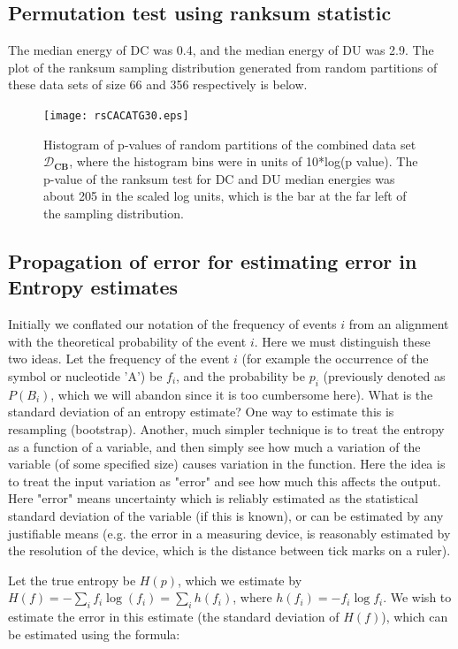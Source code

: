 \subsection{Permutation test using ranksum statistic } 

The median energy of DC was 0.4, and the median energy of DU was 2.9.  The plot of the ranksum sampling distribution generated from random partitions of these data sets of size 66 and 356 respectively is below.
\begin{figure}[!htbp]
 \texttt{[image: rsCACATG30.eps]}\\
  \caption{ Histogram of p-values of random partitions of the combined data set $\mathcal D_{\textbf{CB}}$, where the histogram bins were in units of 10*log(p value).  The p-value of the ranksum test for DC and DU median energies was about 205 in the scaled log units, which is the bar at the far left of the sampling distribution. }
\end{figure}\label{bb}
\newpage
\subsection*{Propagation of error for estimating error in Entropy estimates }
Initially we conflated our notation of the frequency of events $i$ from an alignment with the theoretical probability of the event $i$.  Here we must distinguish these two ideas.  Let the frequency of the event $i$ (for example the occurrence of the symbol or nucleotide 'A') be $f_i$, and the probability be $p_i$ (previously denoted as $P(B_i)$, which we will abandon since it is too cumbersome here).  What is the standard deviation of an entropy estimate?  One way to estimate this is resampling (bootstrap).  Another, much simpler technique is to treat the entropy as a function of a variable, and then simply see how much a variation of the variable (of some specified size) causes variation in the function.  Here the idea is to treat the input variation as "error" and see how much this affects the output.  
Here "error" means uncertainty which is reliably estimated as the statistical standard deviation of the variable (if this is known), or can be estimated by any justifiable means (e.g. the error in a measuring device, is reasonably estimated by the resolution of the device, which is the distance between tick marks on a ruler).  

Let the true entropy be $H(p)$, which we estimate by $H(f)=-\sum_i f_i\log(f_i) =\sum_i h(f_i)$, where $h(f_i)=-f_i\log{f_i}$.  We wish to estimate the error in this estimate (the standard deviation of $H(f)$), which can be estimated using the formula:

